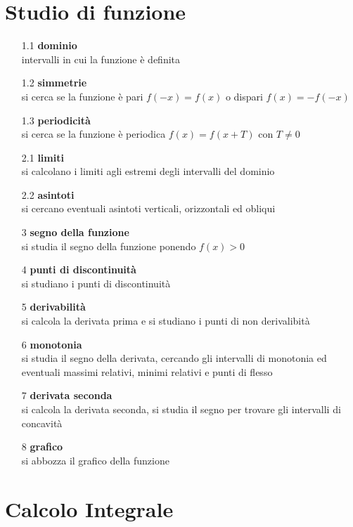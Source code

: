 \documentclass[a4paper]{article}
\begin{document}
\newpage


\section{Studio di funzione}
\begin{itemize}
	\item[1.1] \textbf{dominio} \\
	intervalli in cui la funzione è definita
	\item[1.2] \textbf{simmetrie} \\
	si cerca se la funzione è pari \(f(-x) = f(x)\) o dispari \(f(x) = -f(-x)\)
	\item[1.3] \textbf{periodicità} \\
	si cerca se la funzione è periodica \(f(x) = f(x + T)\) con \(T \neq 0\)
	\item[2.1] \textbf{limiti} \\
	si calcolano i limiti agli estremi degli intervalli del dominio
	\item[2.2] \textbf{asintoti} \\
	si cercano eventuali asintoti verticali, orizzontali ed obliqui
	\item[3] \textbf{segno della funzione} \\
	si studia il segno della funzione ponendo \(f(x) > 0\)
	\item[4] \textbf{punti di discontinuità} \\
	si studiano i punti di discontinuità
	\item[5] \textbf{derivabilità} \\
	si calcola la derivata prima e si studiano i punti di non derivalibità
	\item[6] \textbf{monotonia} \\
	si studia il segno della derivata, cercando gli intervalli di monotonia ed eventuali
	massimi relativi, minimi relativi e punti di flesso
	\item[7] \textbf{derivata seconda} \\
	si calcola la derivata seconda, si studia il segno per trovare gli intervalli di concavità
	\item[8] \textbf{grafico} \\
	si abbozza il grafico della funzione
\end{itemize}

\newpage


\section{Calcolo Integrale}
\end{document}
